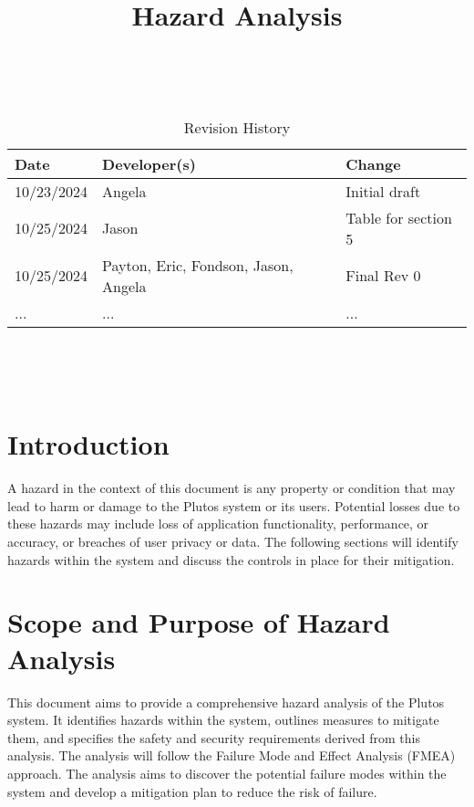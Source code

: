 \documentclass{article}
\title{Hazard Analysis\\\progname}
\author{\authname}
\date{}
\begin{document}
\maketitle
\thispagestyle{empty}

~\newpage


\begin{table}[hp]
\caption{Revision History} \label{TblRevisionHistory}
\begin{tabularx}{\textwidth}{llX}
\toprule
\textbf{Date} & \textbf{Developer(s)} & \textbf{Change}\\
\midrule
10/23/2024 & Angela & Initial draft\\
10/25/2024 & Jason & Table for section 5 \\
10/25/2024 & Payton, Eric, Fondson, Jason, Angela & Final Rev 0 \\
... & ... & ... \\
\bottomrule
\end{tabularx}
\end{table}

~\newpage

\tableofcontents

~\newpage


\section{Introduction}

A hazard in the context of this document is any property or condition that may
lead to harm or damage to the Plutos system or its users. Potential losses due
to these hazards may include loss of application functionality, performance, or
accuracy, or breaches of user privacy or data. The following sections will
identify hazards within the system and discuss the controls in place for their
mitigation.


\section{Scope and Purpose of Hazard Analysis}

This document aims to provide a comprehensive hazard analysis of the Plutos
system. It identifies hazards within the system, outlines measures to mitigate
them, and specifies the safety and security requirements derived from this
analysis. The analysis will follow the Failure Mode and Effect Analysis (FMEA)
approach. The analysis aims to discover the potential failure modes within the
system and develop a mitigation plan to reduce the risk of failure. 
\end{document}
